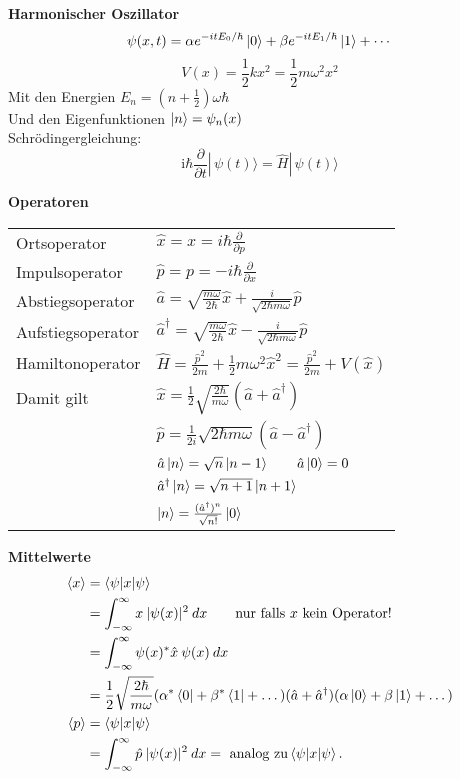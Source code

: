 \documentclass[landscape,8pt]{scrartcl}
\newcommand{\myheading}[1]{\noindent\textbf{#1}\\}
\begin{document}
\begin{multicols}{3}

\myheading{Harmonischer Oszillator}
\[
	\psi(x,t)
		= \alpha e^{-itE_0/\hbar}\ket 0 
		+ \beta  e^{-itE_1/\hbar}\ket 1  
		+ \cdots
\]
\[V(x)=\frac 1 2 k x^2 = \frac 1 2 m \omega^2 x^2\]
Mit den Energien $E_n = \left(n+\frac 12\right) \omega \hbar $ \\
Und den Eigenfunktionen $\ket n = \psi_n(x)$\\
Schrödingergleichung:
\[\mathrm{i}\hbar\frac{\partial}{\partial t} |\,\psi (t) \rangle = \hat{H} |\,\psi (t) \rangle\]


\myheading{Operatoren}
\begin{tabular}{ll}
Ortsoperator 			& $\hat x = x = i \hbar \frac{\partial}{\partial p}$	\\
Impulsoperator 			& $\hat p = p = -i\hbar \frac{\partial}{\partial x}$	\\
Abstiegsoperator 		& $\hat a = \sqrt{\frac{m \omega}{2\hbar}} \hat x + \frac{i}{\sqrt{2\hbar m \omega}} \hat p$	\\
Aufstiegsoperator 		& $\hat a^\dagger = \sqrt{\frac{m \omega}{2\hbar}} \hat x - \frac{i}{\sqrt{2\hbar m \omega}} \hat p$ \\
Hamiltonoperator		& $\hat H=\frac{\hat p^2}{2m}+\frac{1}{2}m\omega^2\hat x^2 = \frac{\hat p^2}{2m} + V(\hat x)$	\\
Damit gilt				& $\hat x  = \frac 12 \sqrt{\frac{2\hbar}{m\omega}}(\hat a + \hat a^\dagger) $ \\
						& $\hat p  = \frac 1{2i} \sqrt {2\hbar m \omega} (\hat a - \hat a^\dagger) $\\
						& $\hat a\ket n = \sqrt{n}\ket{n-1} \qquad \hat a \ket 0 = 0$ \\
						& $\hat a^\dagger \ket n = \sqrt{n+1}\ket {n+1}$	\\
						& $\ket n = \frac{(\hat a^\dagger)^n}{\sqrt {n!}} \ket 0 $
\end{tabular}

\myheading{Mittelwerte}
\begin{align*}
\braket{x} 	&=\braket{\psi|x|\psi}\\
			&=\int_{-\infty}^{\infty} x\:|\psi(x)|^2\:dx\qquad\text{nur falls } x \text{ kein Operator!}\\
			&=\int_{-\infty}^{\infty} \psi(x)^\ast \hat x\:\psi(x)\:dx		\\
			&=\frac 12 \sqrt{\frac{2\hbar}{m\omega}}(\alpha^\ast \bra 0 + \beta^\ast \bra 1 + \dots) (\hat a + \hat a^\dagger) (\alpha \ket 0 + \beta \ket 1 + \dots) \\
\braket{p}	&=\braket{\psi|x|\psi}	\\
			&=\int_{-\infty}^{\infty} \hat p\:|\psi(x)|^2\:dx= \text{ analog zu}\braket{\psi|x|\psi}\text{.}	\\
\end{align*}



\end{multicols}
\end{document}
